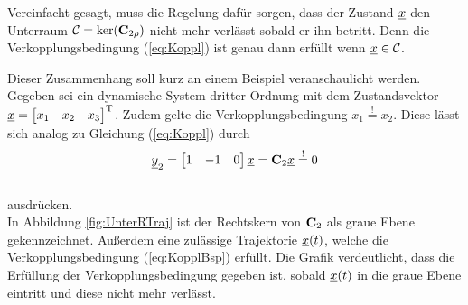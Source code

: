 Vereinfacht gesagt, muss die Regelung dafür sorgen, dass der Zustand $\underline{x}$ den Unterraum $\mathcal{C} = \textnormal{ker}(\textbf{C}_{2\rho})$ nicht mehr verlässt sobald er ihn betritt.
Denn die Verkopplungsbedingung (\ref{eq:Koppl}) ist genau dann erfüllt wenn $\underline{x} \in \mathcal{C} $.

Dieser Zusammenhang soll kurz an einem Beispiel veranschaulicht werden.
Gegeben sei ein dynamische System dritter Ordnung mit dem Zustandsvektor $\underline{x} = \begin{bmatrix}
x_{1} &x_{2} &x_{3} \end{bmatrix}^{\textnormal{T}}$.
Zudem gelte die Verkopplungsbedingung $x_1 \stackrel{!}{=} x_2$. Diese lässt sich analog zu Gleichung (\ref{eq:Koppl}) durch 
\begin{equation}\label{eq:KopplBsp}
	\underline{y}_{2} = \begin{bmatrix}
		1 &-1 &0
	\end{bmatrix} \underline{x} = \textbf{C}_{2}\underline{x} \stackrel{!}{=} 0 
\end{equation}\\
ausdrücken.\\
In Abbildung \ref{fig:UnterRTraj} ist der Rechtskern von $\textbf{C}_{2}$ als graue Ebene gekennzeichnet. Außerdem eine zulässige Trajektorie $\underline{x}(t)$, welche die Verkopplungsbedingung (\ref{eq:KopplBsp}) erfüllt. Die Grafik verdeutlicht, dass die Erfüllung der Verkopplungsbedingung gegeben ist, sobald $\underline{x}(t)$ in die graue Ebene eintritt und diese nicht mehr verlässt. 

